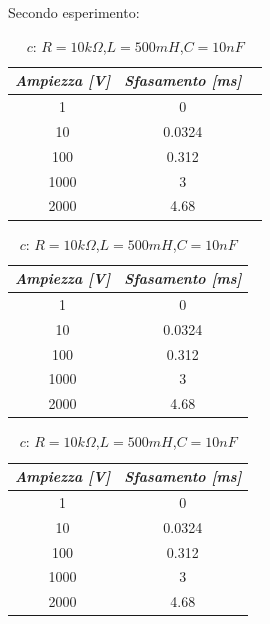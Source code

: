     Secondo esperimento:
    \begin{table} [!htb]
        \begin{minipage}{.32\linewidth}
            \caption{$a$: $R = 10k\Omega$,$L = 500mH $,$C = 10nF$}
            \centering
            \begin{tabular}{|c|c|c|}
                \hline
                \textit{Ampiezza [V]} & \textit{Sfasamento [ms]} \\
                \hline
                1 & 0 \\
                \hline
                10 & 0.0324 \\
                \hline
                100 & 0.312 \\
                \hline
                1000 & 3 \\
                \hline
                2000 & 4.68 \\
                \hline
            \end{tabular}
        \end{minipage}
        \begin{minipage}{.32\linewidth}
            \caption{$b$: $R = 10k\Omega$,$L = 500mH $,$C = 10nF$}
            \centering
            \begin{tabular}{|c|c|}
                \hline
                \textit{Ampiezza [V]} & \textit{Sfasamento [ms]} \\
                \hline
                1 & 0 \\
                \hline
                10 & 0.0324 \\
                \hline
                100 & 0.312 \\
                \hline
                1000 & 3 \\
                \hline
                2000 & 4.68 \\
                \hline
            \end{tabular}
        \end{minipage}
        \begin{minipage}{.32\linewidth}
            \caption{$c$: $R = 10k\Omega$,$L = 500mH $,$C = 10nF$}
            \centering
            \begin{tabular}{|c|c|}
                \hline
                \textit{Ampiezza [V]} & \textit{Sfasamento [ms]} \\
                \hline
                1 & 0 \\
                \hline
                10 & 0.0324 \\
                \hline
                100 & 0.312 \\
                \hline
                1000 & 3 \\
                \hline
                2000 & 4.68 \\
                \hline
            \end{tabular}
        \end{minipage}
    \end{table}


